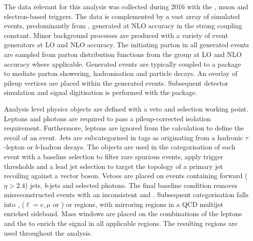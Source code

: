 The data relevant for this analysis was collected during 2016 with the \ptmiss, muon and electron-based triggers. The data is complemented by a vast array of simulated events, predominantly from \IVj, generated at NLO accuracy in the strong coupling constant. Minor background processes are produced with a variety of event generators at LO and NLO accuracy. The initiating parton in all generated events are sampled from parton distribution functions from the \NNPDF group at LO and NLO accuracy where applicable. Generated events are typically coupled to a package to mediate parton showering, hadronisation and particle decays. An overlay of pileup vertices are placed within the generated events. Subsequent detector simulation and signal digitisation is performed with the \GEANT package.

Analysis level physics objects are defined with a veto and selection working point. Leptons and photons are required to pass a pileup-corrected isolation requirement. Furthermore, leptons are ignored from the \ptmiss calculation to define the recoil of an event. Jets are subcategorised in tags as originating from a hadronic $\tau$-lepton or $b$-hadron decays. The objects are used in the categorisation of each event with a baseline selection to filter rare spurious \ptmiss events, apply trigger thresholds and a lead jet selection to target the topology of a primary jet recoiling against a vector boson. Vetoes are placed on events containing forward (${\eta>2.4}$) jets, $b$-jets and selected photons. The final baseline condition removes misreconstructed events with an inconsistent \ptmiss and \ptmisscalo. Subsequent categorisation falls into \metplusjets, \ellplusjets ($\ell=e,\mu$ or \Ptauh) or \diellplusjets regions, with mirroring regions in a QCD multijet enriched sideband. Mass windows are placed on the combinations of the leptons and the \ptmiss to enrich the signal in all applicable regions. The resulting regions are used throughout the analysis.